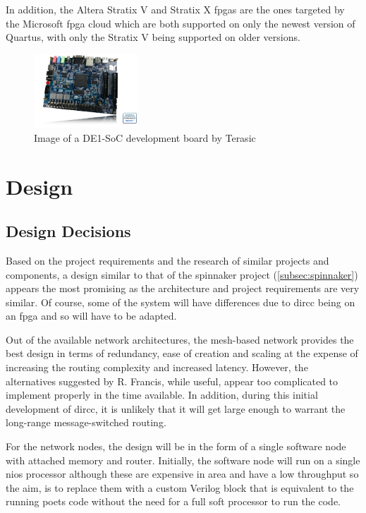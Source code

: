 \documentclass[paper=a4, fontsize=11pt, bibliography=totocnumbered]{scrartcl}
\numberwithin{equation}{section}		%
\numberwithin{figure}{section}			%
\numberwithin{table}{section}				%
\begin{document}
In addition, the Altera Stratix V and Stratix X \glspl{fpga} are the ones targeted by the Microsoft \gls{fpga} cloud\cite{pub:configurable-cloud-acceleration} which are both supported on only the newest version of Quartus, with only the Stratix V being supported on older versions.

\begin{figure}
\centering
\includegraphics[width=0.35\textwidth,keepaspectratio]{DE1-SoC_top45_01.jpg}
\caption{Image of a DE1-SoC development board by Terasic\cite{img:terasic_fpga}}
\label{fig:de1}
\end{figure}

\section{Design}

\subsection{Design Decisions}

Based on the project requirements and the research of similar projects and components, a design similar to that of the \gls{spinnaker} project (\cref{subsec:spinnaker}) appears the most promising as the architecture and project requirements are very similar. Of course, some of the system will have differences due to \gls{dircc} being on an \gls{fpga} and so will have to be adapted.

Out of the available network architectures, the mesh-based network provides the best design in terms of redundancy, ease of creation and scaling at the expense of increasing the routing complexity and increased latency. However, the alternatives suggested by R. Francis\cite{rpt:francis2013exploring}, while useful, appear too complicated to implement properly in the time available. In addition, during this initial development of \gls{dircc}, it is unlikely that it will get large enough to warrant the long-range message-switched routing.

For the \glspl{network node}, the design will be in the form of a single \gls{software node} with attached memory and router. Initially, the \gls{software node} will run on a single \gls{nios} processor although these are expensive in area and have a low throughput so the aim, is to replace them with a custom Verilog block that is equivalent to the running \gls{poets} code without the need for a full \gls{soft processor} to run the code.
\end{document}
